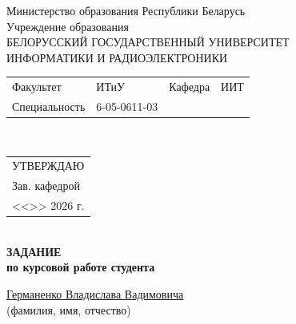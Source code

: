 {
  \thispagestyle{empty}
  \setlength{\parindent}{0em}

  \newcommand{\lineunderscore}{\uline{\hspace*{\fill}}}

  \begin{center}
    Министерство образования Республики Беларусь\\
    Учреждение образования\\
    БЕЛОРУССКИЙ ГОСУДАРСТВЕННЫЙ УНИВЕРСИТЕТ \\
    ИНФОРМАТИКИ И РАДИОЭЛЕКТРОНИКИ\\[1em]
  

  \begin{minipage}{\textwidth}
    \begin{flushleft}
      \begin{tabular}{ p{}p{}p{}p{} @{} }
        Факультет & ИТиУ & Кафедра & ИИТ \\
        Специальность   & 6‑05-0611-03
      \end{tabular}
    \end{flushleft}
  \end{minipage}\\[1em]

  \begin{minipage}{\textwidth}
    \begin{flushright}
      \begin{tabular}{p{}}
        УТВЕРЖДАЮ \\[0.5em]
        \underline{\hspace*{6em}} Зав. кафедрой \\
        
        <<\underline{\hspace*{4ex}}>> \underline{\hspace*{7em}} 2026 г.
      \end{tabular}
    \end{flushright}
  \end{minipage}\\[1em]

  \textbf{ЗАДАНИЕ} \\
  \textbf{по курсовой работе студента}

  \lineunderscore\uline{Германенко Владислава Вадимовича}\lineunderscore \\
  {\small (фамилия, имя, отчество) }


\end{center}}
